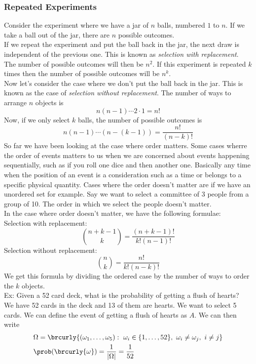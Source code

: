\subsubsection{Repeated Experiments}
Consider the experiment where we have a jar of $n$ balls, numbered $1$ to $n$. If we take a ball out of the jar, there are $n$ possible outcomes.\\
If we repeat the experiment and put the ball back in the jar, the next draw is independent of the previous one. This is known as \textit{selection with replacement}. The number of possible outcomes will then be $n^2$. If this experiment is repeated $k$ times then the number of possible outcomes will be $n^k$.\\
Now let's consider the case where we don't put the ball back in the jar. This is known as the case of \textit{selection without replacement}. The number of ways to arrange $n$ objects is
\[n(n-1)\cdots2\cdot 1=n!\]
Now, if we only select $k$ balls, the number of possible outcomes is
\[n(n-1)\cdots(n-(k-1))=\frac{n!}{(n-k)!}\]
So far we have been looking at the case where order matters. Some cases wherre the order of events matters to us when we are concerned about events happening sequentially, such as if you roll one dice and then another one. Basically any time when the position of an event is a consideration such as a time or belongs to a specific physical quantity. Cases where the order doesn't matter are if we have an unordered set for example. Say we want to select a committee of 3 people from a group of 10. The order in which we select the people doesn't matter.\\
In the case where order doesn't matter, we have the following formulae:\\
Selection with replacement:
\[\binom{n+k-1}{k}=\frac{(n+k-1)!}{k!(n-1)!}\]
Selection without replacement:
\[\binom{n}{k}=\frac{n!}{k!(n-k)!}\]
We get this formula by dividing the ordered case by the number of ways to order the $k$ objects.\\
Ex: Given a 52 card deck, what is the probability of getting a flush of hearts?\\
We have 52 cards in the deck and 13 of them are hearts. We want to select 5 cards. We can define the event of getting a flush of hearts as $A$. We can then write
\begin{align*}
    &\Omega=\brcurly{(\omega_1,\ldots,\omega_5):\ \omega_i\in\{1,\ldots,52\},\ \omega_i\neq\omega_j,\ i\neq j}\\
    &\prob(\brcurly{\omega})=\frac{1}{|\Omega|}=\frac{1}{52}
\end{align*}
